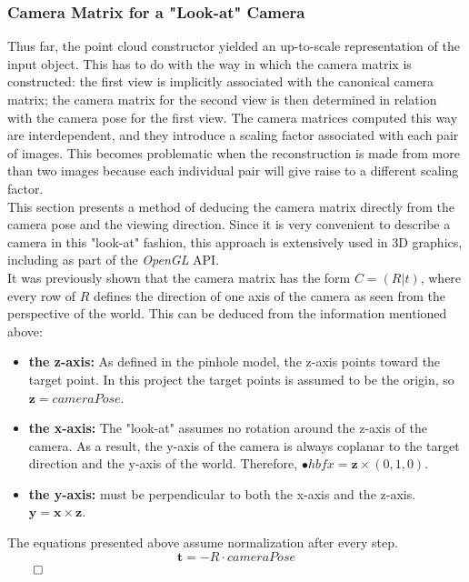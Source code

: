 \documentclass[12pt,a4paper,twoside,openright]{report}
\begin{document}
\subsubsection{Camera Matrix for a "Look-at" Camera}
Thus far, the point cloud constructor yielded an up-to-scale representation of the input object. This has to do with the way in which the camera matrix is constructed: the first view is implicitly associated with the canonical camera matrix; the camera matrix for the second view is then determined in relation with the camera pose for the first view. The camera matrices computed this way are interdependent, and they introduce a scaling factor associated with each pair of images. This becomes problematic when the reconstruction is made from more than two images because each individual pair will give raise to a different scaling factor. \\
This section presents a method of deducing the camera matrix directly from the camera pose and the viewing direction. Since it is very convenient to describe a camera in this "look-at" fashion, this approach is extensively used in 3D graphics, including as part of the \emph{OpenGL} API.\\
\linebreak
It was previously shown that the camera matrix has the form $C = (R | t)$, where every row of $R$ defines the direction of one axis of the camera as seen from the perspective of the world. This can be deduced from the information mentioned above:
\begin{itemize}
\item \textbf{the z-axis:} As defined in the pinhole model, the z-axis points toward the target point. In this project the target points is assumed to be the origin, so $\mathbf{z} = cameraPose$. 
\item \textbf{the x-axis:} The "look-at" assumes no rotation around the z-axis of the camera. As a result, the y-axis of the camera is always coplanar to the target direction and the y-axis of the world. Therefore, $\mathbf{•}hbf{x} = \mathbf{z} \times (0, 1, 0)$.
\item \textbf{the y-axis:} must be perpendicular to both the x-axis and the z-axis. $\mathbf{y} = \mathbf{x} \times \mathbf{z}$.
\end{itemize}
The equations presented above assume normalization after every step.\\
\linebreak
\begin{equation}
\mathbf{t} = -R \cdot cameraPose
\end{equation}
$\qedhere$
\end{document}

